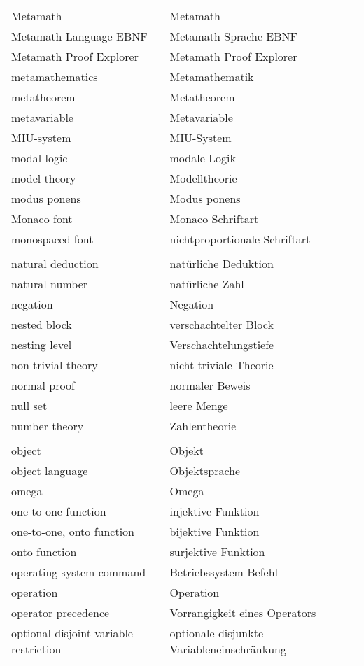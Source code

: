 \begin{longtabu}   { @{} X[l] X[l] }
    Metamath & Metamath \\
    Metamath Language EBNF & Metamath-Sprache EBNF \\
    Metamath Proof Explorer & Metamath Proof Explorer \\
    metamathematics & Metamathematik \\
    metatheorem & Metatheorem \\
    metavariable & Metavariable \\
    MIU-system & MIU-System \\
    modal logic & modale Logik \\
    model theory & Modelltheorie \\
    modus ponens & Modus ponens \\
    Monaco font & Monaco Schriftart \\
    monospaced font & nichtproportionale Schriftart \\
     & \\
    natural deduction & natürliche Deduktion \\
    natural number & natürliche Zahl \\
    negation & Negation \\
    nested block & verschachtelter Block \\
    nesting level & Verschachtelungstiefe \\
    non-trivial theory & nicht-triviale Theorie \\
    normal proof & normaler Beweis \\
    null set & leere Menge \\
    number theory & Zahlentheorie \\
     & \\
    object & Objekt \\
    object language & Objektsprache \\
    omega & Omega \\
    one-to-one function & injektive Funktion \\
    one-to-one, onto function & bijektive Funktion \\
    onto function & surjektive Funktion \\
    operating system command & Betriebssystem-Befehl \\
    operation & Operation \\
    operator precedence & Vorrangigkeit eines Operators \\
    optional disjoint-{\allowbreak}variable restriction & \hangindent=0.5cm optionale disjunkte Variableneinschränkung\vspace{3pt} \\

\end{longtabu}
